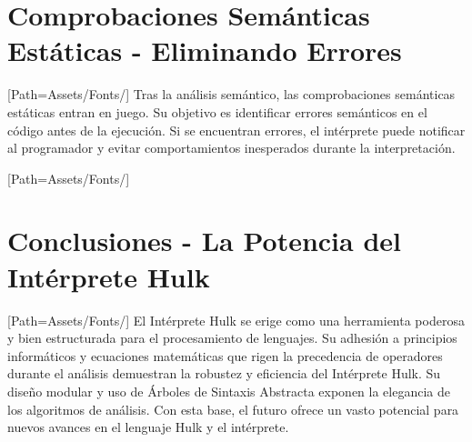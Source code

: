 \documentclass{article}
\begin{document}
\section{ Comprobaciones Semánticas Estáticas - Eliminando Errores}
    \setmainfont{LEMONMILK-Regular.otf}[Path=Assets/Fonts/]
    Tras la análisis semántico, las comprobaciones semánticas estáticas entran en juego. Su objetivo es identificar errores semánticos en el código antes de la ejecución. Si se encuentran errores, el intérprete puede notificar al programador y evitar comportamientos inesperados durante la interpretación.
\newpage

\setmainfont{LEMONMILK-Bold.otf}[Path=Assets/Fonts/]
\section{Conclusiones - La Potencia del Intérprete Hulk}
    \setmainfont{LEMONMILK-Regular.otf}[Path=Assets/Fonts/]
    El Intérprete Hulk se erige como una herramienta poderosa y bien estructurada para el procesamiento de lenguajes. Su adhesión a principios informáticos y ecuaciones matemáticas que rigen la precedencia de operadores durante el análisis demuestran la robustez y eficiencia del Intérprete Hulk. Su diseño modular y uso de Árboles de Sintaxis Abstracta exponen la elegancia de los algoritmos de análisis. Con esta base, el futuro ofrece un vasto potencial para nuevos avances en el lenguaje Hulk y el intérprete.
\newpage

\end{document}
